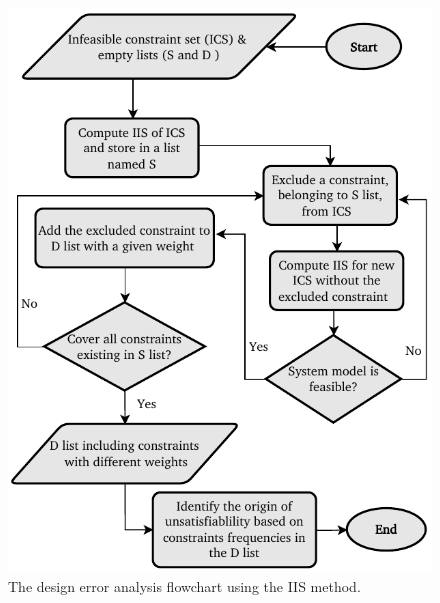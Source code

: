     
    
    
    
    
    
       
        \begin{figure}[t]
    	\centering
    	\includegraphics[width=0.7\columnwidth]{figures/flowchart_designerror.pdf}
    	\caption{The design error analysis flowchart using the IIS method.}
    	\label{fig61}
    \end{figure}
    
